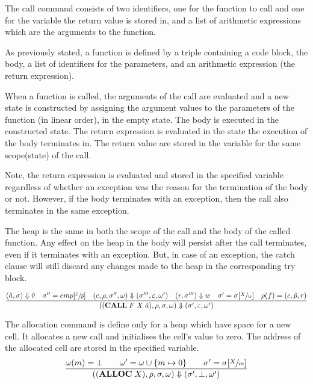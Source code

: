 The call command consists of two identifiers, one for the function to call and one for the variable the return value is stored in, and a list of arithmetic expressions which are the arguments to the function.

As previously stated, a function is defined by a triple containing a code block, the body, a list of identifiers for the parameters, and an arithmetic expression (the return expression).

When a function is called, the arguments of the call are evaluated and a new state is constructed by assigning the argument values to the parameters of the function (in linear order), in the empty state. The body is executed in the constructed state. The return expression is evaluated in the state the execution of the body terminates in. The return value are stored in the variable for the same scope(state) of the call.

Note, the return expression is evaluated and stored in the specified variable regardless of whether an exception was the reason for the termination of the body or not. However, if the body terminates with an exception, then the call also terminates in the same exception.

The heap is the same in both the scope of the call and the body of the called function. Any effect on the heap in the body will persist after the call terminates, even if it terminates with an exception. But, in case of an exception, the catch clause will still discard any changes made to the heap in the corresponding try block.

\begin{equation}
\frac
{(\tilde{a},\sigma) \Downarrow \tilde{v} \quad \sigma''= emp[\sfrac{\tilde{v}}{\tilde{p}}] \quad (c, \rho, \sigma'', \omega) \Downarrow (\sigma''', \varepsilon, \omega') \quad (r,\sigma''') \Downarrow w \quad \sigma' = \sigma[\sfrac{X}{w}] \quad \rho(f) = (c, \tilde{p}, r)}
{((\textbf{CALL}\; F \; X  \; \tilde{a}), \rho, \sigma, \omega) \Downarrow (\sigma', \varepsilon, \omega')}
\end{equation}

The allocation command is define only for a heap which have space for a new cell. It allocates a new call and initialises the cell's value to zero. The address of the allocated cell are stored in the specified variable.
\begin{equation}
\frac
{\omega(m)=\bot \qquad \omega'=\omega\cup\{m \mapsto 0\} \qquad \sigma' = \sigma[\sfrac{X}{m}]}
{((\textbf{ALLOC}\;X), \rho, \sigma, \omega) \Downarrow (\sigma', \bot, \omega')}
\end{equation}

